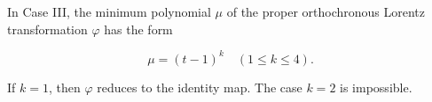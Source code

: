 In Case III, the minimum polynomial $\mu$ of the proper orthochronous Lorentz transformation $\varphi$ has the form

$$\mu = (t - 1)^k \quad (1 \leq k \leq 4).$$

If $k = 1$, then $\varphi$ reduces to the identity map. The case $k = 2$ is impossible.
